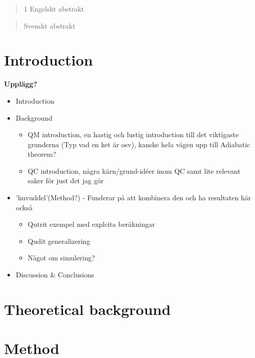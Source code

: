 \documentclass[a4paper, 12pt]{article}
\begin{document}
\begin{abstract}1
    Engelskt abstrakt
\end{abstract}

\bigskip

\bigskip

\bigskip

\bigskip

\begin{otherlanguage}{swedish}
\begin{abstract}
    Svenskt abstrakt
  
\end{abstract}
\end{otherlanguage}


\newpage
\tableofcontents
\newpage
{}

\section{Introduction}
\textbf{Upplägg?}
\begin{itemize}
\item Introduction
\item Background
\begin{itemize}
\item QM introduction, en hastig och lustig introduction till det viktigaste grunderna (Typ vad en ket är osv), kanske hela vägen upp till Adiabatic theorem?
\item QC introduction, några kärn/grund-idéer inom QC samt lite relevant saker för just det jag gör
\end{itemize}
\item 'huvuddel'(Method?) - Funderar på att kombinera den och ha resultaten här också
\begin{itemize}
\item Qutrit exempel med explcita beräkningar
\item Qudit generalizering
\item Något om simulering?
\end{itemize}
\item Discussion \& Conclusions
\end{itemize}



\section{Theoretical background}



\section{Method}
%




\newpage
%

\newpage




\appendix
\end{document}

